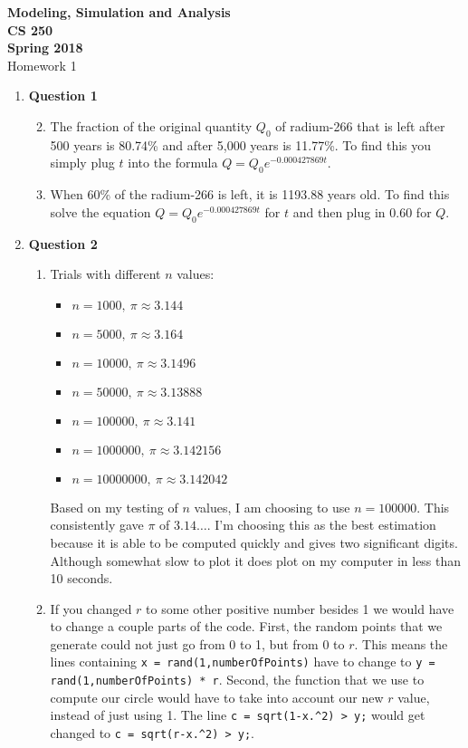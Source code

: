 \documentclass[12pt]{article}
\begin{document}
\begin{center}
\textbf{Modeling, Simulation and Analysis\\CS 250\\Spring 2018}\\
Homework 1
\end{center}

\begin{enumerate}
  \item \textbf{Question 1}
  \begin{enumerate}
    \setcounter{enumii}{1}
  	\item The fraction of the original quantity $Q_0$ of radium-266 that is left after 500 years is 80.74\% and after 5,000 years is 11.77\%. To find this you simply plug $t$ into the formula $Q=Q_0e^{-0.000427869t}$.
  	\item When 60\% of the radium-266 is left, it is 1193.88 years old. To find this solve the equation $Q=Q_0e^{-0.000427869t}$ for $t$ and then plug in 0.60 for $Q$.
  \end{enumerate}
  \item \textbf{Question 2}
  \begin{enumerate}
  	\item Trials with different $n$ values:
			\begin{itemize}
				\item $n = 1000,\ \pi \approx 3.144$
				\item $n = 5000,\ \pi \approx 3.164$
				\item $n = 10000,\ \pi \approx 3.1496$
				\item $n = 50000,\ \pi \approx 3.13888$
				\item $n = 100000,\ \pi \approx 3.141$
				\item $n = 1000000,\ \pi \approx 3.142156$
				\item $n = 10000000,\ \pi \approx 3.142042$
			\end{itemize}
			Based on my testing of $n$ values, I am choosing to use $n = 100000$. This consistently gave $\pi$ of $3.14\ldots$. I'm choosing this as the best estimation because it is able to be computed quickly and gives two significant digits. Although somewhat slow to plot it does plot on my computer in less than 10 seconds.
			\setcounter{enumii}{3}
			\item If you changed $r$ to some other positive number besides 1 we would have to change a couple parts of the code. First, the random points that we generate could not just go from 0 to 1, but from 0 to $r$. This means the lines containing \texttt{x = rand(1,numberOfPoints)} have to change to \texttt{y = rand(1,numberOfPoints) * r}. Second, the function that we use to compute our circle would have to take into account our new $r$ value, instead of just using 1. The line \texttt{c = sqrt(1-x.\textasciicircum2) > y;} would get changed to \texttt{c = sqrt(r-x.\textasciicircum2) > y;}.
  \end{enumerate}
\end{enumerate}
\end{document}
